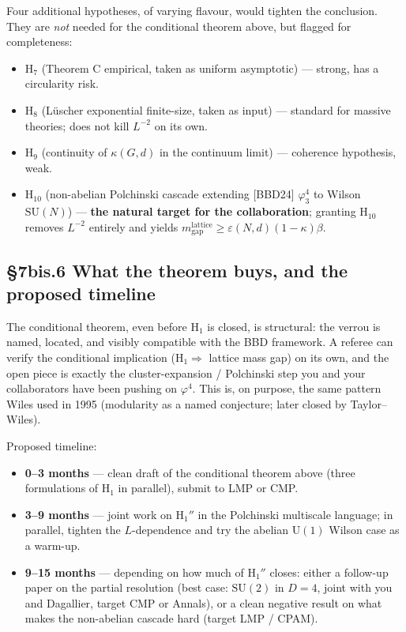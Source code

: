 \documentclass[11pt,a4paper]{article}
\newcommand{\SU}[1]{\mathrm{SU}(#1)}
\begin{document}
Four additional hypotheses, of varying flavour, would tighten the conclusion. They are \emph{not} needed for the conditional theorem above, but flagged for completeness:
\begin{itemize}
  \item $\mathrm{H}_7$ (Theorem C empirical, taken as uniform asymptotic) --- strong, has a circularity risk.
  \item $\mathrm{H}_8$ (Lüscher exponential finite-size, taken as input) --- standard for massive theories; does not kill $L^{-2}$ on its own.
  \item $\mathrm{H}_9$ (continuity of $\kappa(G, d)$ in the continuum limit) --- coherence hypothesis, weak.
  \item $\mathrm{H}_{10}$ (non-abelian Polchinski cascade extending [BBD24] $\varphi^4_3$ to Wilson $\SU{N}$) --- \textbf{the natural target for the collaboration}; granting $\mathrm{H}_{10}$ removes $L^{-2}$ entirely and yields $m_{\mathrm{gap}}^{\mathrm{lattice}} \ge \varepsilon(N, d)(1-\kappa)\beta$.
\end{itemize}

\subsection*{§7bis.6 What the theorem buys, and the proposed timeline}

The conditional theorem, even before $\mathrm{H}_1$ is closed, is structural: the verrou is named, located, and visibly compatible with the BBD framework. A referee can verify the conditional implication ($\mathrm{H}_1 \Rightarrow$ lattice mass gap) on its own, and the open piece is exactly the cluster-expansion / Polchinski step you and your collaborators have been pushing on $\varphi^4$. This is, on purpose, the same pattern Wiles used in 1995 (modularity as a named conjecture; later closed by Taylor--Wiles).

Proposed timeline:
\begin{itemize}
  \item \textbf{0--3 months} --- clean draft of the conditional theorem above (three formulations of $\mathrm{H}_1$ in parallel), submit to LMP or CMP.
  \item \textbf{3--9 months} --- joint work on $\mathrm{H}_1''$ in the Polchinski multiscale language; in parallel, tighten the $L$-dependence and try the abelian $\mathrm{U}(1)$ Wilson case as a warm-up.
  \item \textbf{9--15 months} --- depending on how much of $\mathrm{H}_1''$ closes: either a follow-up paper on the partial resolution (best case: $\SU{2}$ in $D=4$, joint with you and Dagallier, target CMP or Annals), or a clean negative result on what makes the non-abelian cascade hard (target LMP / CPAM).
\end{itemize}
\end{document}
